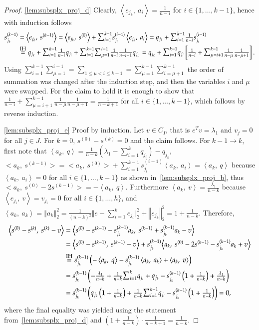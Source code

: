 \documentclass[twoside,11pt]{article}
\newcommand{\0}{\mathcal{O}}
\newcommand{\transp}{^T}
\newcommand{\norm}[1]{\left\Vert#1\right\Vert}
\newcommand{\bnorm}[1]{\big\Vert#1\big\Vert}
\newcommand{\scp}[2]{\left<#1,\ #2\right>}
\newcommand{\bscp}[2]{\big<#1,\ #2\big>}
\newcommand{\discint}[2]{\{#1,\dotsc,#2\}}
\newcommand{\inint}[2]{\in\discint{#1}{#2}}
\newcommand{\charusing}[2]{\overset{\text{\footnotesize #2}}{#1}}
\newcommand{\equsing}[1]{\charusing{=}{#1}}
\newcommand{\smallsum}{\scalebox{1.2}{$\sum$}}
\begin{document}
\begin{proof}
\ref{lem:subsplx_proj_d}
Clearly, $\scp{e_{j_k}}{a_i} = \tfrac{1}{n-i}$ for $i\inint{1}{k-1}$, hence with induction follows
\begin{align*}
  s^{(k-1)}_{j_k}
  &= \bscp{e_{j_k}}{s^{(k-1)}}
   = \bscp{e_{j_k}}{s^{(0)}} + \smallsum_{i=1}^{k-1} s^{(i-1)}_{j_i}\scp{e_{j_k}}{a_i}
  = q_{j_k} + \smallsum_{i=1}^{k-1}\tfrac{1}{n-i} s^{(i-1)}_{j_i}\\
  &\equsing{IH} q_{j_k} + \smallsum_{i=1}^{k-1}\tfrac{1}{n-i}q_{j_i} + \smallsum_{i=1}^{k-1}\smallsum_{\mu=1}^{i-1}\tfrac{1}{n-i}\tfrac{1}{n-i+1}q_{j_\mu}
  = q_{j_k} + \smallsum_{i=1}^{k-1}q_{j_i}\left[\tfrac{1}{n-i} + \smallsum_{\mu=i+1}^{k-1}\tfrac{1}{n-\mu}\tfrac{1}{n-\mu+1}\right]\text{.}
\end{align*}
Using $\sum\nolimits_{i=1}^{k-1}\sum\nolimits_{\mu=1}^{i-1} = \sum_{1\leq\mu < i\leq k-1} = \sum\nolimits_{\mu=1}^{k-1}\sum\nolimits_{i=\mu+1}^{k-1}$ the order of summation was changed after the induction step, and then the variables $i$ and $\mu$ were swapped.
For the claim to hold it is enough to show that $\tfrac{1}{n-i} + \sum\nolimits_{\mu=i+1}^{k-1}\tfrac{1}{n-\mu}\tfrac{1}{n-\mu+1} = \tfrac{1}{n - k + 1}$ for all $i\inint{1}{k-1}$, which follows by reverse induction.

\ref{lem:subsplx_proj_e}
Proof by induction. Let $v\in C_I$, that is $e\transp v = \lambda_1$ and $v_j = 0$ for all $j\in J$.
For $k = 0$, $s^{(0)} - s^{(k)} = 0$ and the claim follows.
For $k - 1\to k$, first note that
$\scp{a_k}{q} = \tfrac{1}{n-k}\left(\lambda_1 - \sum_{i=1}^{k}q_{j_i}\right) - q_{j_k}$,
$\bscp{a_k}{s^{(k-1)}} = \bscp{a_k}{s^{(0)}} + \sum_{i=1}^{k-1}s^{(i-1)}_{j_i}\scp{a_k}{a_i} = \scp{a_k}{q}$ because $\scp{a_k}{a_i} = 0$ for all $i\inint{1}{k-1}$ as shown in~\ref{lem:subsplx_proj_b},
thus $\bscp{a_k}{s^{(0)} - 2s^{(k-1)}} = -\scp{a_k}{q}$.
Furthermore $\scp{a_k}{v} = \tfrac{\lambda_1}{n-k}$ because $\scp{e_{j_i}}{v} = v_{j_i} = 0$ for all $i\inint{1}{h}$, and
$\scp{a_k}{a_k} = \norm{a_k}_2^2 = \frac{1}{\left(n - k\right)^2}\bnorm{e - \sum\nolimits_{i=1}^k e_{j_i}}_2^2 + \norm{e_{j_k}}_2^2 = 1 + \tfrac{1}{n - k}$.
Therefore,
\begin{align*}
  \bscp{s^{(0)} - s^{(k)}}{s^{(k)} - v}
  &= \bscp{s^{(0)} - s^{(k-1)} - s^{(k-1)}_{j_k}a_k}{s^{(k-1)} + s^{(k-1)}_{j_k}a_k - v}\\
  &= \bscp{s^{(0)} - s^{(k-1)}}{s^{(k-1)} - v} + s^{(k-1)}_{j_k}\bscp{a_k}{s^{(0)} - 2s^{(k-1)} - s^{(k-1)}_{j_k}a_k + v}\\
  &\equsing{IH} s^{(k-1)}_{j_k}\left(-\scp{a_k}{q} - s^{(k-1)}_{j_k}\scp{a_k}{a_k} + \scp{a_k}{v}\right)\\
  &= s^{(k-1)}_{j_k}\left(-\tfrac{\lambda_1}{n-k} + \tfrac{1}{n-k}\smallsum_{i=1}^{k}q_{j_i} +q_{j_k} - s^{(k-1)}_{j_k} \left(1 + \tfrac{1}{n-k}\right) + \tfrac{\lambda_1}{n-k}\right)\\
  &= s^{(k-1)}_{j_k}\left(q_{j_k}\left(1 + \tfrac{1}{n-k}\right) + \tfrac{1}{n-k}\smallsum_{i=1}^{k-1}q_{j_i} - s^{(k-1)}_{j_k} \left(1 + \tfrac{1}{n-k}\right)\right)
  = 0\text{,}
\end{align*}
where the final equality was yielded using the statement from~\ref{lem:subsplx_proj_d} and $\left(1 + \tfrac{1}{n-k}\right)\cdot\tfrac{1}{n-k+1} = \tfrac{1}{n-k}$.


\end{proof}
\end{document}
